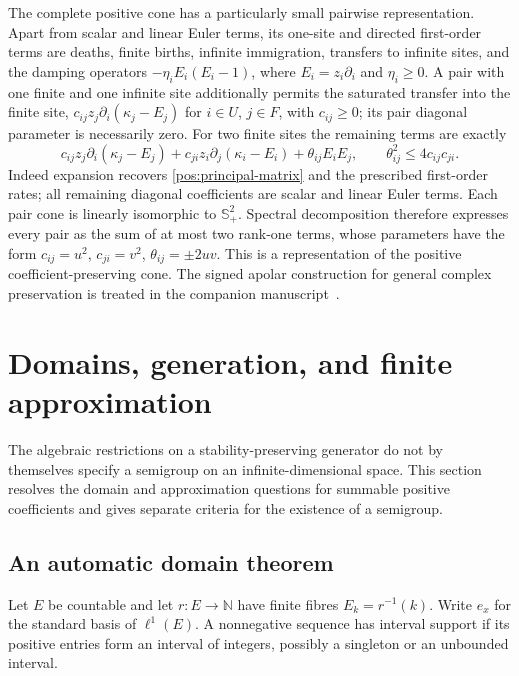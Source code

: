 \documentclass[reqno]{amsart}
\theoremstyle{definition}
\theoremstyle{remark}
\newcommand{\N}{\mathbb N}
\begin{document}
The complete positive cone has a particularly small pairwise representation.
Apart from scalar and linear Euler terms, its one-site and directed
first-order terms are deaths, finite births, infinite immigration,
transfers to infinite sites, and the damping operators
\(-\eta_iE_i(E_i-1)\), where \(E_i=z_i\partial_i\) and \(\eta_i\geq0\).
A pair with one finite and one infinite site additionally permits the
saturated transfer into the finite site,
\(c_{ij}z_j\partial_i(\kappa_j-E_j)\) for \(i\in U\), \(j\in F\),
with \(c_{ij}\geq0\); its pair diagonal parameter is necessarily zero.
For two finite sites the remaining terms are exactly
\begin{equation}\label{gen:eq-positive-pair}
 c_{ij}z_j\partial_i(\kappa_j-E_j)
 +c_{ji}z_i\partial_j(\kappa_i-E_i)+\theta_{ij}E_iE_j,
 \qquad \theta_{ij}^2\leq4c_{ij}c_{ji}.
\end{equation}
Indeed expansion recovers \eqref{pos:principal-matrix} and the prescribed
first-order rates; all remaining diagonal coefficients are scalar and
linear Euler terms.  Each pair cone is linearly isomorphic to
\(\mathbb S_+^2\).  Spectral decomposition therefore expresses every pair
as the sum of at most two rank-one terms, whose parameters have the form
\(c_{ij}=u^2\), \(c_{ji}=v^2\), \(\theta_{ij}=\pm2uv\).
This is a representation of the positive coefficient-preserving cone.
The signed apolar construction for general complex preservation is treated
in the companion manuscript~\cite{WeiGenerators2026}.


\section{Domains, generation, and finite approximation}
\label{ana:section}

The algebraic restrictions on a stability-preserving generator do not by
themselves specify a semigroup on an infinite-dimensional space.  This section
resolves the domain and approximation questions for summable positive
coefficients and gives separate criteria for the existence of a semigroup.

\subsection{An automatic domain theorem}

Let \(E\) be countable and let \(r:E\to\N\) have finite fibres
\(E_k=r^{-1}(k)\).  Write \(e_x\) for the standard basis of \(\ell^1(E)\).
A nonnegative sequence has interval support if its positive entries form an
interval of integers, possibly a singleton or an unbounded interval.
\end{document}
